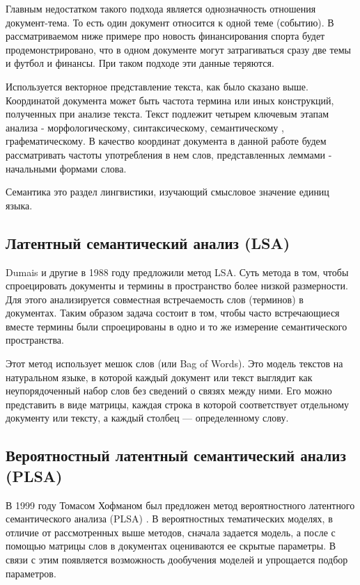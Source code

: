 Главным недостатком такого подхода является однозначность отношения документ-тема. То есть один документ относится к одной теме (событию). В рассматриваемом ниже примере про новость финансирования спорта будет продемонстрировано, что в одном документе могут затрагиваться сразу две темы и футбол и финансы. При таком подходе эти данные теряются.

Используется векторное представление текста, как было сказано выше. Координатой документа может быть частота термина или иных конструкций, полученных при анализе текста. Текст подлежит четырем ключевым этапам анализа - морфологическому, синтаксическому, семантическому \cite{Klyshinskiy2}, графематическому. В качество координат документа в данной работе будем рассматривать частоты употребления в нем слов, представленных леммами - начальными формами слова.

Семантика это раздел лингвистики, изучающий смысловое значение единиц языка.

\subsection{Латентный семантический анализ (LSA)}

Dumais и другие \cite{Dumais1} в 1988 году предложили метод LSA. Суть метода в том, чтобы спроецировать документы и термины в пространство более низкой размерности. Для этого анализируется совместная встречаемость слов (терминов) в документах. Таким образом задача состоит в том, чтобы часто встречающиеся вместе термины были спроецированы в одно и то же измерение семантического пространства.

Этот метод использует мешок слов (или Bag of Words). Это модель текстов на натуральном языке, в которой каждый документ или текст выглядит как неупорядоченный набор слов без сведений о связях между ними. Его можно представить в виде матрицы, каждая строка в которой соответствует отдельному документу или тексту, а каждый столбец — определенному слову.

\subsection{Вероятностный латентный семантический анализ (PLSA)}

В 1999 году Томасом Хофманом был предложен метод вероятностного латентного семантического анализа (PLSA) \cite{Hofmann} \cite{Hofmann1}. В вероятностных тематических моделях, в отличие от рассмотренных выше методов, сначала задается модель, а после с помощью матрицы слов в документах оцениваются ее скрытые параметры. В связи с этим появляется возможность дообучения моделей и упрощается подбор параметров.

